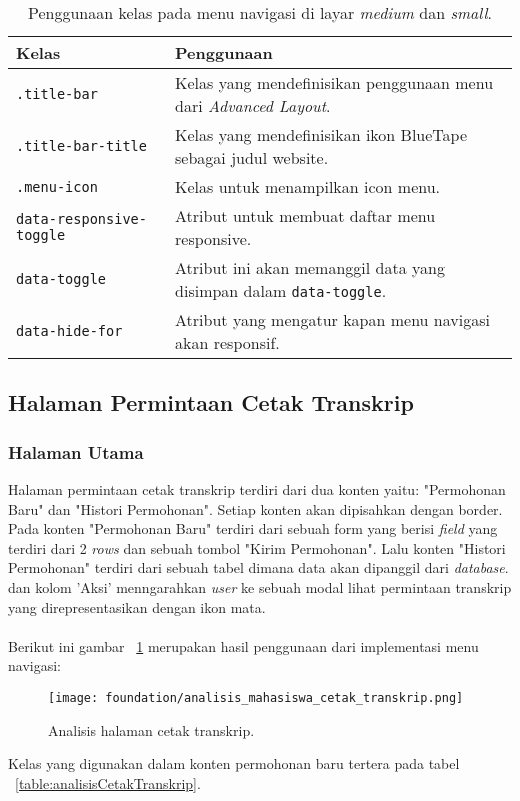 \begin{table}[H]
	\centering
	\caption{Penggunaan kelas pada menu navigasi di layar \textit{medium} dan \textit{small}.}
	\begin{tabularx}{\textwidth}{lX}
		\toprule
		Kelas     & Penggunaan \\
		\midrule
		\texttt{.title-bar}  & Kelas yang mendefinisikan penggunaan menu dari \textit{Advanced Layout}.\\
		\texttt{.title-bar-title}	 & Kelas yang mendefinisikan ikon BlueTape sebagai judul website.\\		
		\texttt{.menu-icon} & Kelas untuk menampilkan icon menu.\\			
		\texttt{data-responsive-toggle} & Atribut untuk membuat daftar menu responsive.\\
		\texttt{data-toggle} & Atribut ini akan memanggil data yang disimpan dalam \texttt{data-toggle}.\\	
		\texttt{data-hide-for} & Atribut yang mengatur kapan menu navigasi akan responsif.\\
		\bottomrule
	\end{tabularx}%
	\label{table:navigasiMedium}
\end{table}%

\subsection{Halaman Permintaan Cetak Transkrip}
\subsubsection{Halaman Utama}

\par Halaman permintaan cetak transkrip terdiri dari dua konten yaitu: "Permohonan Baru" dan "Histori Permohonan". Setiap konten akan dipisahkan dengan border. Pada konten "Permohonan Baru" terdiri dari sebuah form yang berisi \textit{field} yang terdiri dari 2 \textit{rows} dan sebuah tombol "Kirim Permohonan". Lalu konten "Histori Permohonan" terdiri dari sebuah tabel dimana data akan dipanggil dari \textit{database}.  dan kolom 'Aksi' menngarahkan \textit{user} ke sebuah modal lihat permintaan transkrip yang direpresentasikan dengan ikon mata.\\ \\
Berikut ini gambar ~\ref{fig:analisisCetakTranskrip} merupakan hasil penggunaan dari implementasi menu navigasi:

\begin{figure} [H]
	\centering  
	\texttt{[image: foundation/analisis\_mahasiswa\_cetak\_transkrip.png]}
	\caption{Analisis halaman cetak transkrip.} 
	\label{fig:analisisCetakTranskrip}
\end{figure} 
\noindent Kelas yang digunakan dalam konten permohonan baru tertera pada tabel ~\ref{table:analisisCetakTranskrip}.\\

